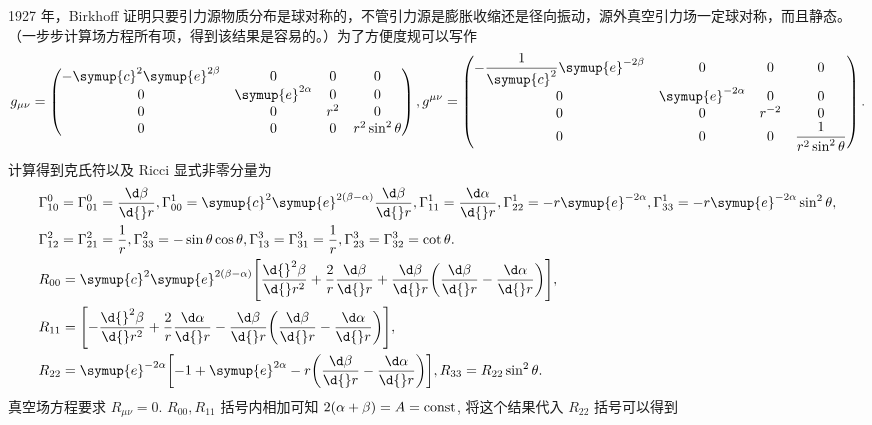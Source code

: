 \documentclass[UTF8, 12pt, a4paper, oneside, onecolumn, fontset=none]{ctexart}
\begin{document}
1927 年，Birkhoff 证明只要引力源物质分布是球对称的，不管引力源是膨胀收缩还是径向振动，源外真空引力场一定球对称，而且静态。（一步步计算场方程所有项，得到该结果是容易的。）为了方便度规可以写作
\begin{equation}
g_{\mu\nu}=\begin{pmatrix}
-\symup{c}^{2}\symup{e}^{2\beta} & 0 & 0 & 0\\
0 & \symup{e}^{2\alpha} & 0 & 0\\
0 & 0 & r^{2} & 0\\
0 & 0 & 0 & r^{2}\sin^{2}{\theta}\\
\end{pmatrix},
g^{\mu\nu}=\begin{pmatrix}
-\dfrac{1}{\symup{c}^{2}}\symup{e}^{-2\beta} & 0 & 0 & 0\\
0 & \symup{e}^{-2\alpha} & 0 & 0\\
0 & 0 & r^{-2} & 0\\
0 & 0 & 0 & \dfrac{1}{r^{2}\sin^{2}{\theta}}\\
\end{pmatrix}.
\end{equation}
计算得到克氏符以及 Ricci 显式非零分量为
\begin{align}
&\Gamma_{10}^{0}=\Gamma_{01}^{0}=\frac{\d\beta}{\d{}r},\Gamma_{00}^{1}=\symup{c}^{2}\symup{e}^{2\mleft(\beta-\alpha\mright)}\frac{\d\beta}{\d{}r},\Gamma_{11}^{1}=\frac{\d\alpha}{\d{}r},\Gamma_{22}^{1}=-r\symup{e}^{-2\alpha},\Gamma_{33}^{1}=-r\symup{e}^{-2\alpha}\sin^{2}{\theta},\notag\\
&\Gamma_{12}^{2}=\Gamma_{21}^{2}=\frac{1}{r},\Gamma_{33}^{2}=-\sin{\theta}\cos{\theta},\Gamma_{13}^{3}=\Gamma_{31}^{3}=\frac{1}{r},\Gamma_{23}^{3}=\Gamma_{32}^{3}=\cot{\theta}.\notag\\
&R_{00}=\symup{c}^{2}\symup{e}^{2\mleft(\beta-\alpha\mright)}\mleft[\frac{\d{}^{2}\beta}{\d{}r^{2}}+\frac{2}{r}\frac{\d\beta}{\d{}r}+\frac{\d\beta}{\d{}r}\mleft(\frac{\d\beta}{\d{}r}-\frac{\d\alpha}{\d{}r}\mright)\mright],\notag\\
&R_{11}=\mleft[-\frac{\d{}^{2}\beta}{\d{}r^{2}}+\frac{2}{r}\frac{\d\alpha}{\d{}r}-\frac{\d\beta}{\d{}r}\mleft(\frac{\d\beta}{\d{}r}-\frac{\d\alpha}{\d{}r}\mright)\mright],\notag\\
&R_{22}=\symup{e}^{-2\alpha}\mleft[-1+\symup{e}^{2\alpha}-r\mleft(\frac{\d\beta}{\d{}r}-\frac{\d\alpha}{\d{}r}\mright)\mright], R_{33}=R_{22}\sin^{2}{\theta}.\notag
\end{align}
真空场方程要求 $R_{\mu\nu}=0$. $R_{00}, R_{11}$ 括号内相加可知 $2\mleft(\alpha+\beta\mright)=A=\mathrm{const}$, 将这个结果代入 $R_{22}$ 括号可以得到
\end{document}
